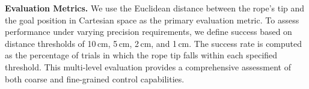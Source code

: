 \documentclass{article}
\begin{document}






 
 
\textbf{Evaluation Metrics.} We use the Euclidean distance between the rope's tip and the goal position in Cartesian space as the primary evaluation metric. To assess performance under varying precision requirements, we define success based on distance thresholds of 10\,cm, 5\,cm, 2\,cm, and 1\,cm. The success rate is computed as the percentage of trials in which the rope tip falls within each specified threshold. This multi-level evaluation provides a comprehensive assessment of both coarse and fine-grained control capabilities.
\end{document}
